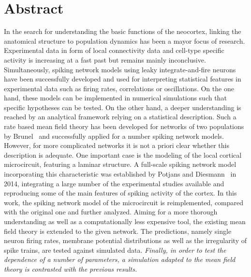 \section{Abstract}
\label{abstract}
In the search for understanding the basic functions of the neocortex, 
linking the anatomical structure to population dynamics has been a mayor
focus of research. Experimental data in form of local connectivity data
and cell-type specific activity is increasing at a fast past but remains
mainly inconclusive. Simultaneously, spiking network models using 
leaky integrate-and-fire neurons 
have been successfully developed and used for interpreting 
statistical features in experimental data such as firing rates, 
correlations or oscillations. 
On the one hand, these models can be implemented in numerical 
simulations such that specific hypotheses can be tested. 
On the other hand, a deeper understanding is reached by 
an analytical framework relying on a statistical description.
Such a rate based mean field theory has been developed 
for networks of two populations
by Brunel~\cite{brunel2000} and successfully applied for a number 
spiking network models. However, for more complicated networks
it is not a priori clear whether this description is adequate. 
One important case is the modeling of the local cortical 
microcircuit, featuring a laminar structure. 
A full-scale spiking network model incorporating this characteristic
was established by Potjans and Diesmann~\cite{potjans2014} in 2014, 
integrating a large number of the experimental studies available and reproducing
some of the main features of spiking activity of the cortex.
In this work, the spiking network model of the microcircuit is reimplemented, 
compared with the original one and further analyzed.
Aiming for a more thorough understanding as well as a computationally less
expensive tool, the existing mean field theory is extended to the given network. 
The predictions, namely single neuron firing rates, 
membrane potential distributions as well as the irregularity of spike trains, 
are tested against simulated data. \emph{Finally, in order to test 
the dependence of a number of parameters, a simulation adapted to the 
mean field theory is contrasted with the previous results.}
